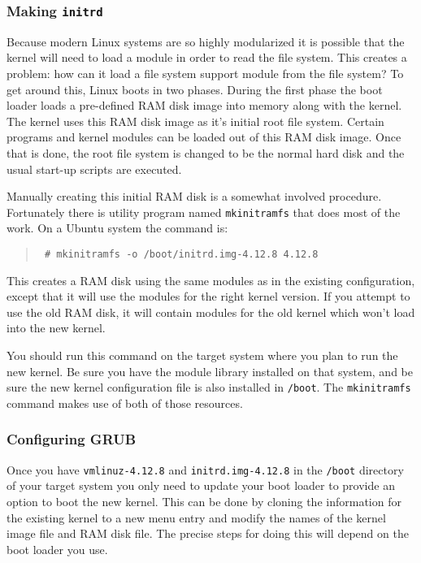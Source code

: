 \documentclass{article}
\newcommand{\command}[1]{\texttt{#1}}
\newcommand{\filename}[1]{\texttt{#1}}
\newenvironment{commands}
  {\begin{quote} \tt}
  {\end{quote}}
\begin{document}
\subsubsection{Making \filename{initrd}}

Because modern Linux systems are so highly modularized it is possible that the kernel will need
to load a module in order to read the file system. This creates a problem: how can it load a
file system support module from the file system? To get around this, Linux boots in two phases.
During the first phase the boot loader loads a pre-defined RAM disk image into memory along with
the kernel. The kernel uses this RAM disk image as it's initial root file system. Certain
programs and kernel modules can be loaded out of this RAM disk image. Once that is done, the
root file system is changed to be the normal hard disk and the usual start-up scripts are
executed.

Manually creating this initial RAM disk is a somewhat involved procedure. Fortunately there is
utility program named \command{mkinitramfs} that does most of the work. On a Ubuntu system the
command is:
\begin{commands}
\# mkinitramfs -o /boot/initrd.img-4.12.8 4.12.8
\end{commands}

This creates a RAM disk using the same modules as in the existing configuration, except that it
will use the modules for the right kernel version. If you attempt to use the old RAM disk, it
will contain modules for the old kernel which won't load into the new kernel.

You should run this command on the target system where you plan to run the new kernel. Be sure
you have the module library installed on that system, and be sure the new kernel configuration
file is also installed in \filename{/boot}. The \command{mkinitramfs} command makes use of both
of those resources.

\subsubsection{Configuring GRUB}

Once you have \filename{vmlinuz-4.12.8} and \filename{initrd.img-4.12.8} in the
\filename{/boot} directory of your target system you only need to update your boot loader to
provide an option to boot the new kernel. This can be done by cloning the information for the
existing kernel to a new menu entry and modify the names of the kernel image file and RAM disk
file. The precise steps for doing this will depend on the boot loader you use.
\end{document}
